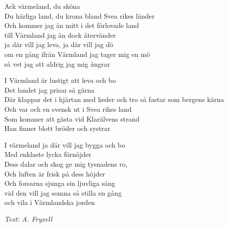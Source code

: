 \vspace{10pt}
Ack värmeland, du sköna\\
Du härliga land, du krona bland Svea rikes länder\\
Och kommer jag än mitt i det förlovade land\\
till Värmland jag än dock återvänder\\
ja där vill jag leva, ja där vill jag dö\\
om en gång ifrån Värmland jag tager mig en mö\\
så vet jag att aldrig jag mig ångrar\par
\vspace{10pt}
I Värmland är lustigt att leva och bo\\
Det landet jag prisar så gärna\\
Där klappar det i hjärtan med heder och tro så fastar som bergens kärna\\
Och var och en svensk ut i Svea rikes land\\
Som kommer att gästa vid Klarälvens strand\\
Han finner blott bröder och systrar\par
\vspace{10pt}
I värmeland ja där vill jag bygga och bo\\
Med enklaste lycka förnöjder\\
Dess dalar och skog ge mig tysnadens ro,\\
Och luften är frisk på dess höjder\\
Och forsarna sjunga sin ljuvliga sång\\
vid den vill jag somna så stilla en gång\\
och vila i Värmlandska jorden\par
\vspace{10pt}
{\footnotesize\textit{Text: A. Fryxell}}

